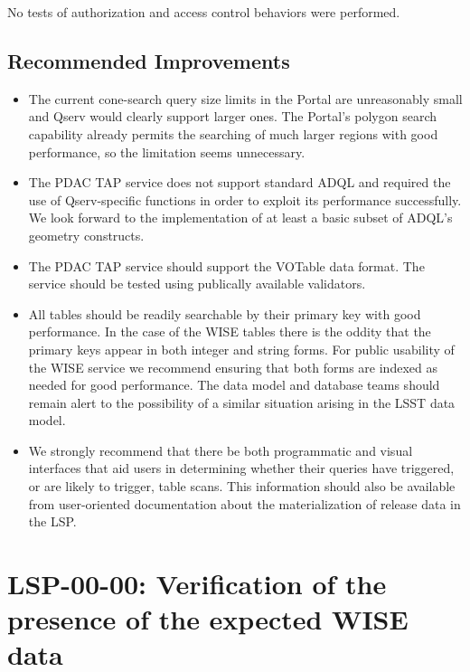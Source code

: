 \documentclass[DM,lsstdraft,STR,toc]{lsstdoc}
\begin{document}
No tests of authorization and access control behaviors were performed.


\subsection{Recommended Improvements}
\label{sect:recommendations}

\begin{itemize}

\item{The current cone-search query size limits in the Portal are unreasonably small and Qserv would clearly support larger ones.
The Portal's polygon search capability already permits the searching of much larger regions with good performance, so the limitation seems unnecessary.}
\item{The PDAC TAP service does not support standard ADQL and required the use of Qserv-specific functions in order to exploit its performance successfully.
We look forward to the implementation of at least a basic subset of ADQL's geometry constructs.}
\item{The PDAC TAP service should support the VOTable data format.
The service should be tested using publically available validators.}
\item{All tables should be readily searchable by their primary key with good performance.
In the case of the WISE tables there is the oddity that the primary keys appear in both integer and string forms.
For public usability of the WISE service we recommend ensuring that both forms are indexed as needed for good performance.
The data model and database teams should remain alert to the possibility of a similar situation arising in the LSST data model.}
\item{We strongly recommend that there be both programmatic and visual interfaces that aid users in determining whether their queries have triggered, or are likely to trigger, table scans.
This information should also be available from user-oriented documentation about the materialization of release data in the LSP.}

\end{itemize}



\section{LSP-00-00: Verification of the presence of the expected WISE data}
\label{sect:detail-lsp-00-00}
\end{document}
